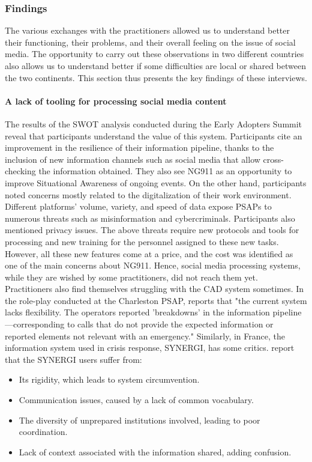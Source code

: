 \subsubsection{Findings}
The various exchanges with the practitioners allowed us to understand better their functioning, their problems, and their overall feeling on the issue of social media.
The opportunity to carry out these observations in two different countries also allows us to understand better if some difficulties are local or shared between the two continents.
This section thus presents the key findings of these interviews.

\paragraph{A lack of tooling for processing social media content}
The results of the SWOT analysis conducted during the Early Adopters Summit reveal that participants understand the value of this system.
Participants cite an improvement in the resilience of their information pipeline, thanks to the inclusion of new information channels such as social media that allow cross-checking the information obtained.
They also see NG911 as an opportunity to improve Situational Awareness of ongoing events.
On the other hand, participants noted concerns mostly related to the digitalization of their work environment.
Different platforms' volume, variety, and speed of data expose PSAPs to numerous threats such as misinformation and cybercriminals.
Participants also mentioned privacy issues.
The above threats require new protocols and tools for processing and new training for the personnel assigned to these new tasks.
However, all these new features come at a price, and the cost was identified as one of the main concerns about NG911.
Hence, social media processing systems, while they are wished by some practitioners, did not reach them yet.
Practitioners also find themselves struggling with the CAD system sometimes.
In the role-play conducted at the Charleston PSAP, \textcite{graceRolePlayingNext2019} reports that "the current system lacks flexibility. The operators reported 'breakdowns' in the information pipeline—corresponding to calls that do not provide the expected information or reported elements not relevant with an emergency."
Similarly, in France, the information system used in crisis response, SYNERGI, has some critics.
\textcite{linotPerspectiveComputationnelleDefi2018} report that the SYNERGI users suffer from:

\begin{itemize}
    \item Its rigidity, which leads to system circumvention.
    \item Communication issues, caused by a lack of common vocabulary.
    \item The diversity of unprepared institutions involved, leading to poor coordination.
    \item Lack of context associated with the information shared, adding confusion.
\end{itemize}

